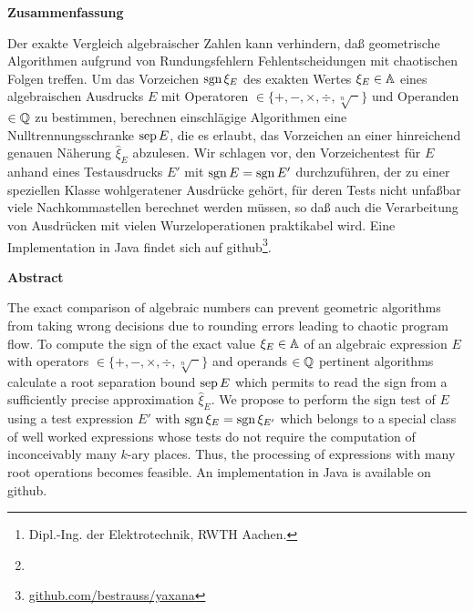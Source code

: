 %
%
\author{\Author\footnote{Dipl.-Ing. der Elektrotechnik, RWTH Aachen.}}
\date{\Date\footnote{\Rev}}
\maketitle
\vfill

\begin{center}
\bf Zusammenfassung
\end{center}

\noindent Der exakte Vergleich algebraischer Zahlen kann verhindern,
daß geometrische Algorithmen
aufgrund von Rundungsfehlern Fehlentscheidungen 
mit chaotischen Folgen treffen.
Um das Vorzeichen $\operatorname{sgn}\xi_E$
des exakten Wertes $\xi_E\in\mathbb{A}$
eines algebraischen Ausdrucks $E$
mit Operatoren $\in\{+, -, \times, \div, \sqrt[n]{\phantom{x}}\}$
und Operanden $\in\mathbb{Q}$ zu bestimmen,
berechnen einschlägige Algorithmen
eine Nulltrennungsschranke $\mathop{\rm sep}\nolimits E$, die es erlaubt,
das Vorzeichen an einer hinreichend genauen
Näherung $\hat{\xi}_E$ abzulesen.
Wir schlagen vor, den Vorzeichentest für $E$ 
anhand eines Testausdrucks 
$E'$ mit $\operatorname{sgn} E=\operatorname{sgn} E'$ durchzuführen,
der zu einer speziellen Klasse wohlgeratener Ausdrücke gehört,
für deren Tests nicht unfaßbar viele Nachkommastellen
berechnet werden müssen,
so daß auch die Verarbeitung von Ausdrücken
mit vielen Wurzeloperationen praktikabel wird.
Eine Implementation in Java findet sich auf
github\footnote{\href{https://github.com/bestrauss/yaxana}{github.com/bestrauss/yaxana}}.


\begin{center}
\bf Abstract
\end{center}

\noindent The exact comparison of algebraic numbers can prevent
geometric algorithms from taking wrong decisions
due to rounding errors leading to chaotic program flow.
To compute the sign of the exact value $\xi_E\in\mathbb{A}$
of an algebraic expression $E$
with operators $\in\{+, -, \times, \div, \sqrt[n]{\phantom{x}}\}$
and operands $\in\mathbb{Q}$
pertinent algorithms calculate a root separation bound $\mathop{\rm sep}\nolimits E$
which permits to read the sign 
from a sufficiently precise approximation $\hat{\xi}_E$.
We propose to perform the sign test of $E$
using a test expression $E'$ with $\operatorname{sgn}\xi_E=\operatorname{sgn}\xi_{E'}$
which belongs to a special class of well worked expressions
whose tests do not require the computation of inconceivably 
many $k$-ary places.
Thus, the processing of expressions with many root operations
becomes feasible.
An implementation in Java is available on github\footnotemark[1].

\vfill

%
%
